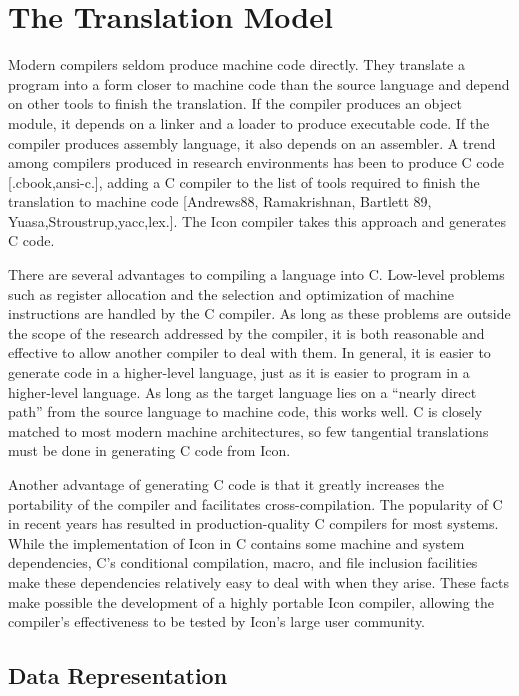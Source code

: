 \clearpage\chapter{The Translation Model}

Modern compilers seldom produce machine code directly. They translate
a program into a form closer to machine code than the source language
and depend on other tools to finish the translation. If the compiler
produces an object module, it depends on a linker and a loader to
produce executable code. If the compiler produces assembly language,
it also depends on an assembler. A trend among compilers
produced in research environments has been to produce C code
[.cbook,ansi-c.], adding a C compiler to the list of tools required to
finish the translation to machine code [Andrews88, Ramakrishnan, Bartlett
89, Yuasa,Stroustrup,yacc,lex.]. The Icon compiler takes this approach
and generates C code.


There are several advantages to compiling a language into C. Low-level
problems such as register allocation and the selection and
optimization of machine instructions are handled by the C compiler. As
long as these problems are outside the scope of the research addressed
by the compiler, it is both reasonable and effective to allow another
compiler to deal with them. In general, it is easier to generate code
in a higher-level language, just as it is easier to program in a
higher-level language. As long as the target language lies on a
``nearly direct path'' from the
source language to machine code, this works well. C is closely matched
to most modern machine architectures, so few tangential translations
must be done in generating C code from Icon.


Another advantage of generating C code is that it greatly increases
the portability of the compiler and facilitates cross-compilation. The
popularity of C in recent years has resulted in production-quality C
compilers for most systems.  While the implementation of Icon in C
contains some machine and system dependencies, C's conditional
compilation, macro, and file inclusion facilities make these
dependencies relatively easy to deal with when they arise. These facts
make possible the development of a highly portable Icon compiler,
allowing the compiler's effectiveness to be tested by Icon's large
user community.

\section{Data Representation}

